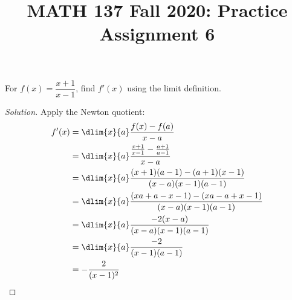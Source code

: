 
\title{MATH 137 Fall 2020: Practice Assignment 6}


\thispagestyle{firstpage}

\textbf{\@title}

\question For $f(x)=\dfrac{x+1}{x-1}$, find $f'(x)$ using the limit definition.
\begin{proof}[Solution]
  Apply the Newton quotient:
  \begin{align*}
    f'(x) & = \dlim{x}{a} \frac{f(x)-f(a)}{x-a}                           \\
          & = \dlim{x}{a} \frac{\frac{x+1}{x-1} - \frac{a+1}{a-1}}{x-a}   \\
          & = \dlim{x}{a} \frac{(x+1)(a-1) - (a+1)(x-1)}{(x-a)(x-1)(a-1)} \\
          & = \dlim{x}{a} \frac{(xa+a-x-1) - (xa-a+x-1)}{(x-a)(x-1)(a-1)} \\
          & = \dlim{x}{a} \frac{-2(x-a)}{(x-a)(x-1)(a-1)}                 \\
          & = \dlim{x}{a} \frac{-2}{(x-1)(a-1)}                           \\
          & = -\frac{2}{(x-1)^2} \qedhere
  \end{align*}
\end{proof}


